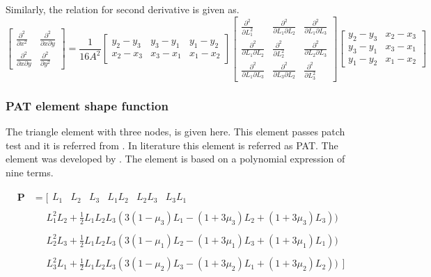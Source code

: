 \documentclass[main.tex]{subfiles}
\begin{document}
Similarly, the relation for second derivative is given as.
\begin{equation}
\begin{bmatrix}
 \frac{\partial ^ 2}{\partial x ^2}   &  \frac{\partial ^ 2}{\partial x \partial y }   
 \\
\frac{\partial ^ 2}{\partial x \partial y } &  \frac{\partial ^ 2}{\partial y ^2} 
\end{bmatrix} 
=
\frac{1}{16 A^2}
\begin{bmatrix}
y_2-y_3 & y_3-y_1 & y_1-y_2 \\
x_2-x_3 & x_3-x_1 & x_1-x_2
\end{bmatrix} 
\begin{bmatrix}
 \frac{\partial^2}{\partial L_1 ^2} &  \frac{\partial^2}{\partial L_1 \partial L_2} &  \frac{\partial^2}{\partial L_1 \partial L_3}  \\
 \frac{\partial^2}{\partial L_1 \partial L_2} & \frac{\partial^2}{\partial L_2 ^2} &   \frac{\partial^2}{\partial L_2 \partial L_3}  \\
 \frac{\partial^2}{\partial L_1 \partial L_3} &   \frac{\partial^2}{\partial L_3 \partial L_2} & \frac{\partial^2}{\partial L_3 ^2}   
\end{bmatrix} 
\begin{bmatrix}
y_2-y_3 & x_2-x_3  \\
y_3-y_1 &  x_3-x_1  \\
y_1-y_2 &  x_1-x_2
\end{bmatrix} 
\end{equation}




\subsubsection{PAT element shape function}
The triangle element with three nodes, is given here. This element passes patch test and it is referred from \cite{ZIENKIE_BOOK_STRUCT_CH11}. In literature this element is referred as PAT. The element was developed by \cite{specht}. The element is based on a polynomial expression of nine terms.
 

\begin{equation}\label{eq:poly}
\begin{split}
\textbf{P} & = [
\begin{matrix}
L_1
&
L_2
&
L_3
&
L_1 L_2
&
L_2 L_3
&
L_3 L_1
\end{matrix} \\
& \quad
\begin{matrix}
L_1^2L_2+\frac{1}{2}L_1L_2L_3(3(1-\mu_3)L_1-(1+3\mu_3)L_2+(1+3\mu_3)L_3) )
\end{matrix}\\
& \quad
\begin{matrix}
L_2^2L_3+\frac{1}{2}L_1L_2L_3(3(1-\mu_1)L_2-(1+3\mu_1)L_3+(1+3\mu_1)L_1) )
\end{matrix}\\
& \quad
\begin{matrix}
L_3^2L_1+\frac{1}{2}L_1L_2L_3(3(1-\mu_2)L_3-(1+3\mu_2)L_1+(1+3\mu_2)L_2) )
\end{matrix} ]
\end{split}
\end{equation}
\end{document}
